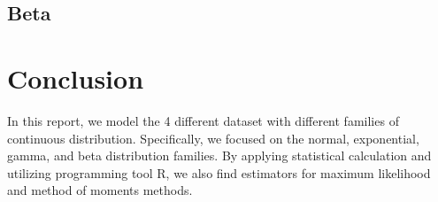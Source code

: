 \documentclass[12pt, a4paper, oneside]{report}
\begin{document}
\newpage
\section*{Beta}










\newpage
\chapter*{Conclusion}
In this report, we model the 4 different dataset with different families of continuous distribution. Specifically, we focused on the normal, exponential, gamma, and beta distribution families. By applying statistical calculation and utilizing programming tool R, we also find estimators for maximum likelihood and method of moments methods.
\end{document}
